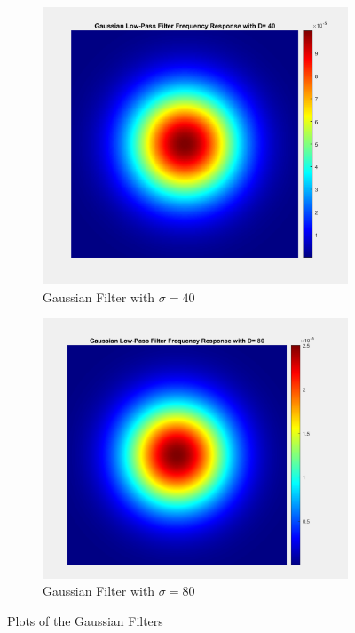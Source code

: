 \documentclass[a4paper]{article}
\begin{document}
\begin{figure}[h]
    \centering
    \begin{subfigure}{0.45\linewidth}
        \centering
        \includegraphics[width=\linewidth]{40_image_filter.png}
        \caption{Gaussian Filter with $\sigma = 40$}
    \end{subfigure}
    \begin{subfigure}{0.45\linewidth}
        \centering
        \includegraphics[width=\linewidth]{80_image_fil.png}
        \caption{Gaussian Filter with $\sigma = 80$}
    \end{subfigure}
    
    \caption{Plots of the Gaussian Filters}
    \label{fig:bo}
\end{figure}
\end{document}
